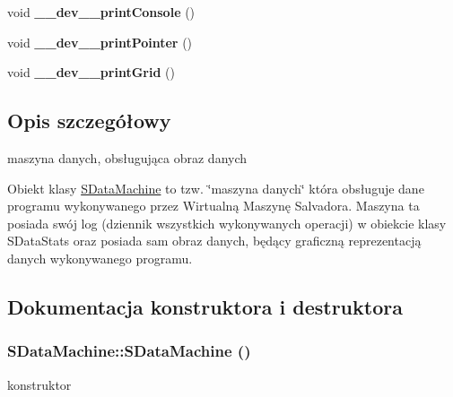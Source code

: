 \begin{CompactItemize}
\item 
\hypertarget{classSDataMachine_da92c5d20a64279ff191059705c3070f}{
void \textbf{\_\-\_\-dev\_\-\_\-printConsole} ()}
\label{classSDataMachine_da92c5d20a64279ff191059705c3070f}

\item 
\hypertarget{classSDataMachine_3d2383297382e73c4f61f7fc231c34b7}{
void \textbf{\_\-\_\-dev\_\-\_\-printPointer} ()}
\label{classSDataMachine_3d2383297382e73c4f61f7fc231c34b7}

\item 
\hypertarget{classSDataMachine_ec760b755d01ea8c9ef3d37aa8f749d2}{
void \textbf{\_\-\_\-dev\_\-\_\-printGrid} ()}
\label{classSDataMachine_ec760b755d01ea8c9ef3d37aa8f749d2}

\end{CompactItemize}


\subsection{Opis szczegółowy}
maszyna danych, obsługująca obraz danych 

Obiekt klasy \hyperlink{classSDataMachine}{SDataMachine} to tzw. \char`\"{}maszyna danych\char`\"{} która obsługuje dane programu wykonywanego przez Wirtualną Maszynę Salvadora. Maszyna ta posiada swój log (dziennik wszystkich wykonywanych operacji) w obiekcie klasy SDataStats oraz posiada sam obraz danych, będący graficzną reprezentacją danych wykonywanego programu. 

\subsection{Dokumentacja konstruktora i destruktora}
\hypertarget{classSDataMachine_3d894df00bd2283c717a827e27138812}{
\subsubsection[{SDataMachine}]{\setlength{\rightskip}{0pt plus 5cm}SDataMachine::SDataMachine ()}}
\label{classSDataMachine_3d894df00bd2283c717a827e27138812}


konstruktor 

